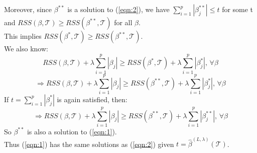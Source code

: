 \documentclass{article}
\newcommand{\hb}{\hat{\beta}}
\begin{document}
	Moreover, since $ \beta^{**} $ is a solution to (\ref{eqn:2}), we have $ \sum_{i = 1}^{p} |\beta^{**}_j| \leq t $ for some t and $ RSS(\beta, \mathcal{T}) \geq RSS(\beta^{**}, \mathcal{T}) $ for all $ \beta $.\\
	This implies $ RSS(\beta^*, \mathcal{T}) \geq RSS(\beta^{**}, \mathcal{T}) $.\\
	We also know:
	\[RSS(\beta, \mathcal{T}) + \lambda \sum_{i = 1}^{p} |\beta_j| \geq RSS(\beta^*, \mathcal{T}) +  \lambda \sum_{i = 1}^{p} |\beta^*_j|, \, \forall \beta\]
	\[\Rightarrow RSS(\beta, \mathcal{T}) + \lambda \sum_{i = 1}^{p} |\beta_j| \geq RSS(\beta^{**}, \mathcal{T}) +  \lambda \sum_{i = 1}^{p} |\beta^*_j|, \, \forall \beta\]
	If $ t = \sum_{i = 1}^{p} |\beta^*_j| $ is again satisfied, then:
	\[\Rightarrow RSS(\beta, \mathcal{T}) + \lambda \sum_{i = 1}^{p} |\beta_j| \geq RSS(\beta^{**}, \mathcal{T}) +  \lambda \sum_{i = 1}^{p} |\beta^{**}_j|, \, \forall \beta\]
	So $ \beta^{**} $ is also a solution to (\ref{eqn:1}).\\
	Thus (\ref{eqn:1}) has the same solutions as (\ref{eqn:2}) given $ t = \hb^{(L, \lambda)}(\mathcal{T}) $.
	
\end{document}
